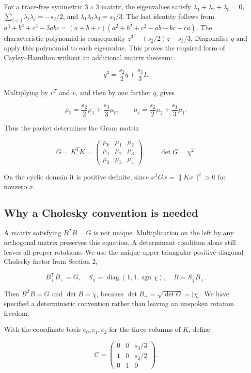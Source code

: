 \documentclass[
  11pt,
  a4paper]{article}
\begin{document}
For a trace-free symmetric \(3\times3\) matrix, the eigenvalues satisfy
\(\lambda_1+\lambda_2+\lambda_3=0\),
\(\sum_{i<j}\lambda_i\lambda_j=-s_2/2\), and
\(\lambda_1\lambda_2\lambda_3=s_3/3\).
The last identity follows from \(a^3+b^3+c^3-3abc=(a+b+c)(a^2+b^2+c^2-ab-bc-ca)\).
The characteristic polynomial is consequently
\(z^3-(s_2/2)z-s_3/3\). Diagonalise \(q\) and apply this polynomial to each eigenvalue. This proves the required form of Cayley--Hamilton without an additional matrix theorem:

\[
q^3=\frac{s_2}{2}q+\frac{s_3}{3}I.
\tag{4.7}
\]

Multiplying by \(v^T\) and \(v\), and then by one further \(q\), gives

\[
\mu_3=\frac{s_2}{2}\mu_1+\frac{s_3}{3}\mu_0,\qquad
\mu_4=\frac{s_2}{2}\mu_2+\frac{s_3}{3}\mu_1.
\tag{4.8}
\]

Thus the packet determines the Gram matrix

\[
G=K^TK=
\begin{pmatrix}
\mu_0&\mu_1&\mu_2\\
\mu_1&\mu_2&\mu_3\\
\mu_2&\mu_3&\mu_4
\end{pmatrix},\qquad \det G=\chi^2.
\tag{4.9}
\]

On the cyclic domain it is positive definite, since \(x^TGx=\|Kx\|^2>0\) for nonzero \(x\).

\hypertarget{why-a-cholesky-convention-is-needed}{%
\subsection{Why a Cholesky convention is needed}\label{why-a-cholesky-convention-is-needed}}

A matrix satisfying \(B^TB=G\) is not unique. Multiplication on the left by any orthogonal matrix preserves this equation. A determinant condition alone still leaves all proper rotations. We use the unique upper-triangular positive-diagonal Cholesky factor from Section 2,

\[
B_+^TB_+=G,
\quad S_\chi=\operatorname{diag}(1,1,\operatorname{sgn}\chi),
\quad B=S_\chi B_+.
\tag{4.10}
\]

Then \(B^TB=G\) and \(\det B=\chi\), because \(\det B_+=\sqrt{\det G}=|\chi|\). We have specified a deterministic convention rather than leaving an unspoken rotation freedom.

With the coordinate basis \(e_0,e_1,e_2\) for the three columns of \(K\), define

\[
C=\begin{pmatrix}0&0&s_3/3\\1&0&s_2/2\\0&1&0\end{pmatrix}.
\tag{4.11}
\]
\end{document}
